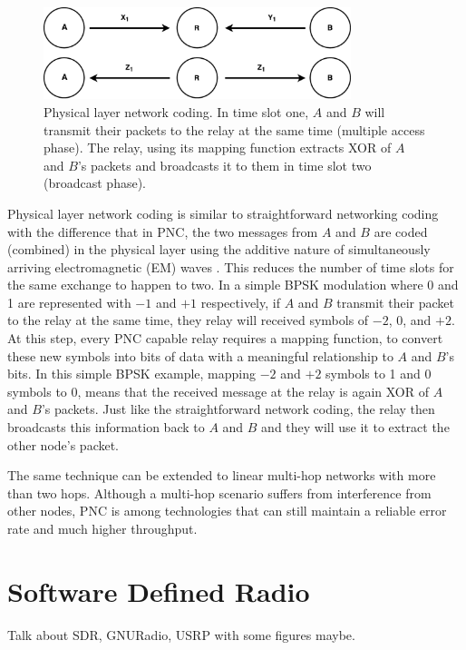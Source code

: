 \begin{figure}
    \centering
    \includegraphics[width=0.8\textwidth]{figures/threeNodePnc.pdf}
    \caption{Physical layer network coding. In time slot one, $A$ and $B$ will transmit their packets to the relay at the same time (multiple access phase). The relay, using its mapping function extracts XOR of $A$ and $B$'s packets and broadcasts it to them in time slot two (broadcast phase).} \label{fig:threeNodePnc}
\end{figure}

Physical layer network coding is similar to straightforward networking coding with the difference that in PNC, the two messages from $A$ and $B$ are coded (combined) in the physical layer using the additive nature of simultaneously arriving electromagnetic (EM) waves \cite{zhang2006hot}. This reduces the number of time slots for the same exchange to happen to two. In a simple BPSK modulation where 0 and 1 are represented with $-1$ and $+1$ respectively, if $A$ and $B$ transmit their packet to the relay at the same time, they relay will received symbols of $-2$, $0$, and $+2$. At this step, every PNC capable relay requires a mapping function, to convert these new symbols into bits of data with a meaningful relationship to $A$ and $B$'s bits. In this simple BPSK example, mapping $-2$ and $+2$ symbols to 1 and $0$ symbols to 0, means that the received message at the relay is again XOR of $A$ and $B$'s packets. Just like the straightforward network coding, the relay then broadcasts this information back to $A$ and $B$ and they will use it to extract the other node's packet.

The same technique can be extended to linear multi-hop networks with more than two hops. Although a multi-hop scenario suffers from interference from other nodes, PNC is among technologies that can still maintain a reliable error rate and much higher throughput.


\section{Software Defined Radio}

Talk about SDR, GNURadio, USRP with some figures maybe.